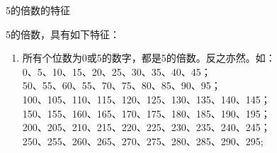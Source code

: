 \documentclass[aspectratio=169]{ctexbeamer} %
\date{\today}
\begin{document}
\begin{frame}[t]{5的倍数的特征}
\begin{spacing}{1.2}
\normalsize
5的倍数，具有如下特征：
\begin{enumerate}[label={\arabic*.}]
\item \alert{所有个位数为0或5的数字，都是5的倍数。反之亦然。如：} \\
0、5、10、15、20、25、30、35、40、45；\\
50、55、60、55、70、75、80、85、90、95；\\
100、105、110、115、120、125、130、135、140、145；\\
150、155、160、165、170、175、180、185、190、195；\\
200、205、210、215、220、225、230、235、240、245；\\
250、255、260、265、270、275、280、285、290、295;
\end{enumerate}

\end{spacing}
\end{frame}
\end{document}
